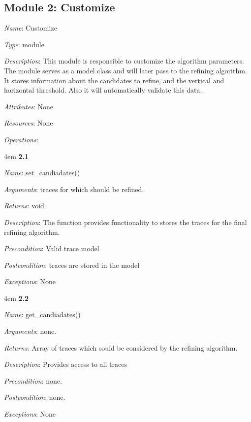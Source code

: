 \documentclass[notitlepage]{article}
\begin{document}
\begin{flushleft}
\par
\endgroup

\subsection{Module 2: Customize}
\textit{Name}: Customize

\textit{Type}: module

\textit{Description}: This module is responsible to customize the algorithm parameters. The module serves as a model class and will later pass to the refining algorithm.
It stores information about the candidates to refine, and the vertical and horizontal threshold. Also it will automatically validate this data.  

\textit{Attributes}: None

\textit{Resources}: None

\textit{Operations}: 
\medskip


\par
\begingroup
\leftskip4em
\textbf{2.1} 

\textit{Name}: set\_candiadates()

\textit{Arguments}: traces for which should be refined.

\textit{Returns}: void

\textit{Description}: The function provides functionality to stores the traces for the final refining algorithm. 

\textit{Precondition}: Valid trace model

\textit{Postcondition}: traces are stored in the model

\textit{Exceptions}: None

\par
\endgroup

\medskip


\par
\begingroup
\leftskip4em
\textbf{2.2} 

\textit{Name}: get\_candiadates()

\textit{Arguments}: none.

\textit{Returns}: Array of traces which sould be considered by the refining algorithm.

\textit{Description}: Provides access to all traces 

\textit{Precondition}: none.

\textit{Postcondition}: none.

\textit{Exceptions}: None
\par
\endgroup


\end{flushleft}
\end{document}

